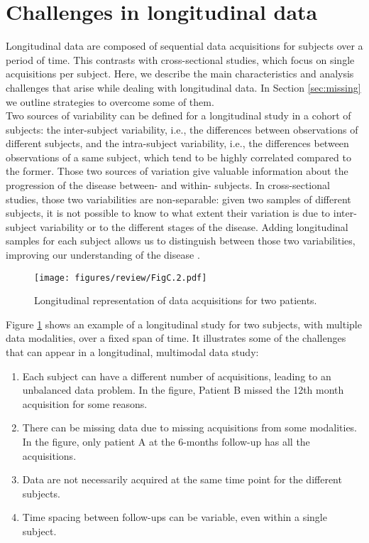 \section{Challenges in longitudinal data}
\label{longanalysis}

Longitudinal data are composed of sequential data acquisitions for subjects over a period of time. This contrasts with cross-sectional studies, which focus on single acquisitions per subject. Here, we describe the main characteristics and analysis challenges that arise while dealing with longitudinal data. In Section \ref{sec:missing} we outline strategies to overcome some of them.  \\

Two sources of variability can be defined for a longitudinal study in a cohort of subjects: the inter-subject variability, i.e., the differences between observations of different subjects, and the intra-subject variability, i.e., the differences between observations of a same subject, which tend to be highly correlated compared to the former. Those two sources of variation give valuable information about the progression of the disease between- and within- subjects. In cross-sectional studies, those two variabilities are non-separable: given two samples of different subjects, it is not possible to know to what extent their variation is due to inter-subject variability or to the different stages of the disease. Adding longitudinal samples for each subject allows us to distinguish between those two variabilities, improving our understanding of the disease \cite{Fitzmaurice2008}. \\

\begin{figure}[htbp]
  \centering
  \texttt{[image: figures/review/FigC.2.pdf]}
  \caption{Longitudinal representation of data acquisitions for two patients.}
  \label{long}
\end{figure}

Figure \ref{long} shows an example of a longitudinal study for two subjects, with multiple data modalities, over a fixed span of time. It illustrates some of the challenges that can appear in a longitudinal, multimodal data study: \\

\begin{enumerate}\itemsep5pt
\item Each subject can have a different number of acquisitions, leading to an unbalanced data problem. In the figure, Patient B missed the 12th month acquisition for some reasons.
\item There can be missing data due to missing acquisitions from some modalities. In the figure, only patient A at the 6-months follow-up has all the acquisitions. 
\item Data are not necessarily acquired at the same time point for the different subjects.
\item Time spacing between follow-ups can be variable, even within a single subject.
\end{enumerate}

